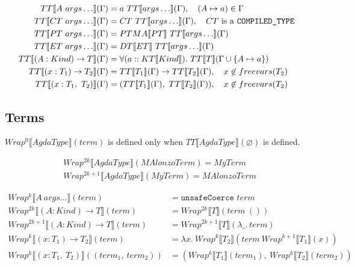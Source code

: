 \begin{align*}
   TT\llbracket A\ args\ldots \rrbracket(\Gamma) &= a\ TT\llbracket args\ldots \rrbracket(\Gamma),
      \quad (A \mapsto a) \in \Gamma \\
   TT\llbracket CT\ args\ldots \rrbracket(\Gamma) &= CT\ TT\llbracket args\ldots \rrbracket(\Gamma),
      \quad CT\text{ is a \texttt{COMPILED\_TYPE}}\\
   TT\llbracket PT\ args\ldots \rrbracket(\Gamma) &= PTMA\llbracket PT \rrbracket\ TT\llbracket args\ldots \rrbracket(\Gamma) \\
   TT\llbracket ET\ args\ldots \rrbracket(\Gamma) &= DT\llbracket ET \rrbracket \ TT\llbracket args\ldots \rrbracket(\Gamma)\\
   TT\llbracket (A : Kind) \rightarrow T \rrbracket(\Gamma) &= \forall (a :: KT\llbracket Kind \rrbracket).
      \ TT\llbracket T \rrbracket(\Gamma \cup \{A \mapsto a\})\\
   TT\llbracket (x : T_1) \rightarrow T_2 \rrbracket(\Gamma) &=
      TT\llbracket T_1 \rrbracket(\Gamma) \rightarrow TT\llbracket T_2 \rrbracket(\Gamma),
      \quad x \not\in freevars(T_2) \\
   TT\llbracket (x : T_1,\ T_2) \rrbracket(\Gamma) &=
      (TT\llbracket T_1 \rrbracket(\Gamma),\ TT\llbracket T_2 \rrbracket(\Gamma)),
      \quad x \not\in freevars(T_2) \\
\end{align*}

\subsection{Terms}

\(Wrap^0\llbracket AgdaType \rrbracket(term)\) is defined only when \(TT\llbracket AgdaType \rrbracket(\varnothing)\) is defined.

\begin{align*}
   &Wrap^{2k}\llbracket AgdaType \rrbracket(MAlonzoTerm) = MyTerm\\
   &Wrap^{2k + 1}\llbracket AgdaType \rrbracket(MyTerm) = MAlonzoTerm
\end{align*}

\begin{align*}
   Wrap^k\llbracket A\ args\ldots \rrbracket(term) &= \texttt{unsafeCoerce } term\\
   Wrap^{2k}\llbracket (A : Kind) \rightarrow T \rrbracket(term) &= Wrap^{2k}\llbracket T \rrbracket(term\ ())\\
   Wrap^{2k+1}\llbracket (A : Kind) \rightarrow T \rrbracket(term) &= Wrap^{2k+1}\llbracket T \rrbracket(\lambda \_.\ term)\\
   Wrap^k\llbracket (x : T_1) \rightarrow T_2 \rrbracket(term) &=
      \lambda x.\ Wrap^k\llbracket T_2 \rrbracket(term\ Wrap^{k+1}\llbracket T_1 \rrbracket(x))\\
   Wrap^k\llbracket (x : T_1,\ T_2) \rrbracket((term_1,\ term_2)) &=
      (Wrap^k\llbracket T_1 \rrbracket(term_1),\ Wrap^k\llbracket T_2 \rrbracket(term_2))
\end{align*}

